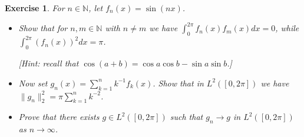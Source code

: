 \documentclass{article}
\newtheorem{exercise}[theorem]{Exercise}
\begin{document}
\begin{exercise}
For $n \in \mathbb{N}$, let $f_n(x) = \sin(n x)$.
\begin{itemize}
    \item[(a)] Show that for $n, m \in \mathbb{N}$ with $n \neq m$ we have $\int_0^{2\pi} f_n(x) f_m(x)dx = 0$, while $\int_0^{2\pi}(f_n(x))^2dx=\pi$.
    
    \textit{[Hint: recall that $\cos(a + b) = \cos a \cos b - \sin a \sin b$.]}
    
    \item[(b)] Now set $g_n(x) = \sum_{k=1}^{n}k^{-1}f_k(x)$. Show that in $L^2([0,2\pi])$ we have $\|g_n\|_2^2 = \pi \sum_{k=1}^{n} k^{-2}$.
    
    \item[(c)] Prove that there exists $g \in L^2([0,2\pi])$ such that $g_n \to g$ in $L^2([0,2\pi])$ as $n \to \infty$.
\end{itemize}
\end{exercise}
\end{document}
